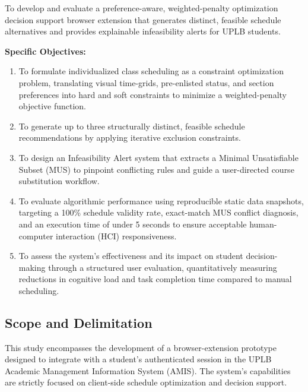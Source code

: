 \documentclass{icsthesis}
\begin{document}
\begin{mainmatter}
		To develop and evaluate a preference-aware, weighted-penalty optimization decision support browser extension that generates distinct, feasible schedule alternatives and provides explainable infeasibility alerts for UPLB students.
		
		\vspace{2ex}
		\textbf{Specific Objectives:}
		\begin{enumerate}
			\item To formulate individualized class scheduling as a constraint optimization problem, translating visual time-grids, pre-enlisted status, and section preferences into hard and soft constraints to minimize a weighted-penalty objective function.
			\item To generate up to three structurally distinct, feasible schedule recommendations by applying iterative exclusion constraints.
			\item To design an Infeasibility Alert system that extracts a Minimal Unsatisfiable Subset (MUS) to pinpoint conflicting rules and guide a user-directed course substitution workflow.
			\item To evaluate algorithmic performance using reproducible static data snapshots, targeting a 100\% schedule validity rate, exact-match MUS conflict diagnosis, and an execution time of under 5 seconds to ensure acceptable human-computer interaction (HCI) responsiveness.
			\item To assess the system's effectiveness and its impact on student decision-making through a structured user evaluation, quantitatively measuring reductions in cognitive load and task completion time compared to manual scheduling.
		\end{enumerate}
		
		\subsection{Scope and Delimitation}
		
		This study encompasses the development of a browser-extension prototype designed to integrate with a student's authenticated session in the UPLB Academic Management Information System (AMIS). The system's capabilities are strictly focused on client-side schedule optimization and decision support.
		

\end{mainmatter}
\end{document}
